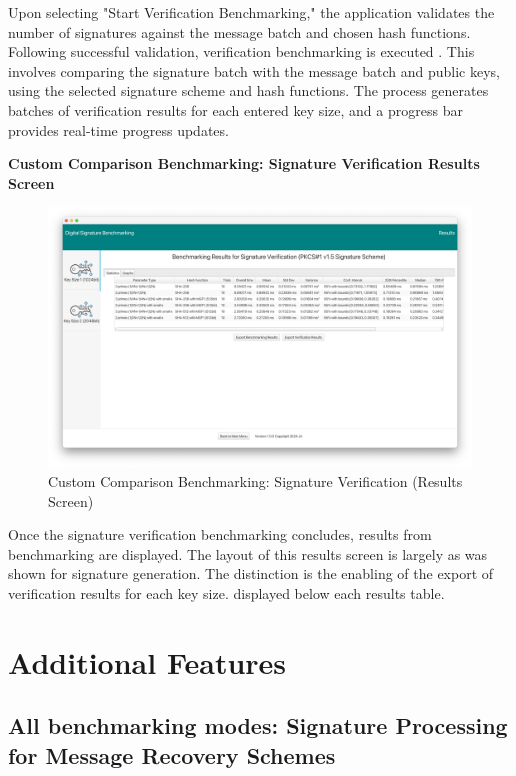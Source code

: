 \documentclass[]{final_report}
\begin{document}
Upon selecting "Start Verification Benchmarking," the application validates the number of signatures against the message batch and chosen hash functions.  Following successful validation,  verification benchmarking is executed . This involves comparing the signature batch with the message batch and public keys, using the selected signature scheme and hash functions. The process generates batches of verification results for each entered key size, and a progress bar provides real-time progress updates.

\newpage
\textbf{Custom Comparison Benchmarking: Signature Verification Results Screen}

\begin{figure}[H]
    \centering
    \includegraphics[scale= 0.325]{main_pictures/ui/custom11.png}
   \caption{Custom Comparison Benchmarking: Signature Verification (Results Screen)}
\end{figure}

Once the signature verification benchmarking concludes, results from benchmarking are displayed. The layout of this results screen is largely as was shown for signature generation. The distinction is the enabling of the export of verification results for each key size. displayed below each results table.




\chapter{Additional Features}

\section{All benchmarking modes: Signature Processing for Message Recovery Schemes}
\end{document}
